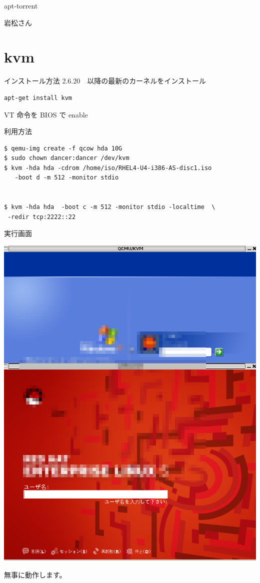 \documentclass[cjk,dvipdfmx]{beamer}
\begin{document}
\begin{frame}{apt-torrent}
 
岩松さん
\end{frame}


\section{kvm}

\begin{frame}[containsverbatim]{インストール方法}
2.6.20　以降の最新のカーネルをインストール

\begin{verbatim}
apt-get install kvm
\end{verbatim}
VT 命令を BIOS で enable
\end{frame}

\begin{frame}[containsverbatim]{利用方法}
\begin{verbatim}
$ qemu-img create -f qcow hda 10G
$ sudo chown dancer:dancer /dev/kvm
$ kvm -hda hda -cdrom /home/iso/RHEL4-U4-i386-AS-disc1.iso
   -boot d -m 512 -monitor stdio


$ kvm -hda hda  -boot c -m 512 -monitor stdio -localtime  \
 -redir tcp:2222::22
\end{verbatim}
\end{frame}

\begin{frame}{実行画面}
\begin{minipage}{0.4\hsize}
 \includegraphics[width=0.9\hsize]{image200701/kvm.png}
\end{minipage}
\begin{minipage}{0.5\hsize}
無事に動作します。
\end{minipage}
\end{frame}
\end{document}
